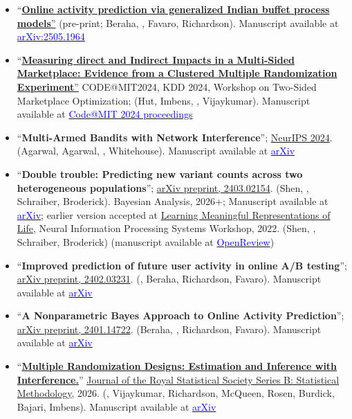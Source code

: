 \begin{itemize}
	\item ``\href{https://arxiv.org/abs/2505.19643}{{\textbf{Online activity prediction via generalized Indian buffet process models}}''} (pre-print; Beraha, \mm, Favaro, Richardson). Manuscript available at \href{https://arxiv.org/abs/2505.1964}{\textcolor{blue}{arXiv:2505.1964}}
	\item ``\href{https://drive.google.com/drive/folders/1557KDfzlwEi-Pn3J0fDgMX3XWwSqyeij}{{\textbf{Measuring direct and Indirect Impacts in a Multi-Sided Marketplace: Evidence from a Clustered Multiple Randomization Experiment}}''} CODE@MIT2024, KDD 2024, Workshop on Two-Sided Marketplace Optimization; (Hut, Imbens, \mm, Vijaykumar). Manuscript available at \href{https://drive.google.com/drive/folders/1557KDfzlwEi-Pn3J0fDgMX3XWwSqyeij}{\textcolor{blue}{Code@MIT 2024 proceedings}}
	\item ``\textbf{Multi-Armed Bandits with Network Interference}''; \href{https://arxiv.org/abs/2405.18621}{NeurIPS 2024}. (Agarwal, Agarwal, \mm, Whitehouse). Manuscript available at \href{https://arxiv.org/abs/2405.18621}{\textcolor{blue}{arXiv}}
	\item ``\textbf{Double trouble: Predicting new variant counts across two heterogeneous populations}''; \href{https://arxiv.org/pdf/2403.02154.pdf}{arXiv preprint, 2403.02154}. (Shen, \mm, Schraiber, Broderick). Bayesian Analysis, 2026+; Manuscript available at \href{https://arxiv.org/pdf/2403.02154.pdf}{\textcolor{blue}{arXiv}}; earlier version accepted at \href{https://www.lmrl.org/}{Learning Meaningful Representations of Life},  Neural Information Processing Systems Workshop, 2022. (Shen, \mm, Schraiber, Broderick) (manuscript available at \href{https://openreview.net/pdf?id=euBgC9yLeyl}{\textcolor{blue}{OpenReview}})
	\item ``\textbf{Improved prediction of future user activity in online A/B testing}''; \href{https://arxiv.org/abs/2402.03231}{arXiv preprint, 2402.03231}. (\mm, Beraha, Richardson, Favaro). Manuscript available at \href{https://arxiv.org/abs/2402.03231}{\textcolor{blue}{arXiv}}
	\item ``\textbf{A Nonparametric Bayes Approach to Online Activity Prediction}''; \href{https://arxiv.org/abs/2401.14722}{arXiv preprint, 2401.14722}. (Beraha, \mm, Richardson, Favaro). Manuscript available at \href{https://arxiv.org/abs/2401.14722}{\textcolor{blue}{arXiv}}
	\item ``\href{https://doi.org/10.1093/jrsssb/qkaf073}{\textbf{Multiple Randomization Designs: Estimation and Inference with Interference.}}'' \href{https://academic.oup.com/jrsssb/advance-article/doi/10.1093/jrsssb/qkaf073/8422435}{Journal of the Royal Statistical Society Series B: Statistical Methodology}, 2026. (\mm, Vijaykumar, Richardson, McQueen, Rosen, Burdick, Bajari, Imbens). Manuscript available at \href{https://arxiv.org/abs/2112.13495}{\textcolor{blue}{arXiv}}

\end{itemize}
